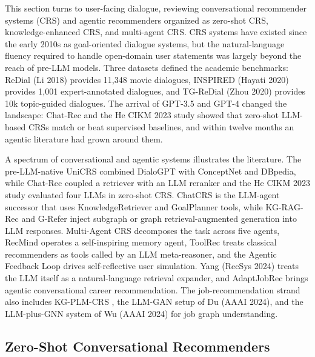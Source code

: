 \documentclass{article}
\begin{document}
This section turns to user-facing dialogue, reviewing conversational recommender systems (CRS) and agentic recommenders organized as zero-shot CRS, knowledge-enhanced CRS, and multi-agent CRS. CRS systems have existed since the early 2010s as goal-oriented dialogue systems, but the natural-language fluency required to handle open-domain user statements was largely beyond the reach of pre-LLM models. Three datasets defined the academic benchmarks: ReDial (Li 2018) provides 11,348 movie dialogues, INSPIRED (Hayati 2020) provides 1,001 expert-annotated dialogues, and TG-ReDial (Zhou 2020) provides 10k topic-guided dialogues. The arrival of GPT-3.5 and GPT-4 changed the landscape: Chat-Rec \citep{gao2023chatrectowardsinte} and the He CIKM 2023 study showed that zero-shot LLM-based CRSs match or beat supervised baselines, and within twelve months an agentic literature had grown around them.

A spectrum of conversational and agentic systems illustrates the literature. The pre-LLM-native UniCRS \citep{wang2022asurveyonthefairne} combined DialoGPT with ConceptNet and DBpedia, while Chat-Rec \citep{gao2023chatrectowardsinte} coupled a retriever with an LLM reranker and the He CIKM 2023 study evaluated four LLMs in zero-shot CRS. ChatCRS \citep{li2025grefergraphretriev} is the LLM-agent successor that uses KnowledgeRetriever and GoalPlanner tools, while KG-RAG-Rec \citep{wang2025knowledgegraphretr} and G-Refer \citep{li2025grefergraphretriev} inject subgraph or graph retrieval-augmented generation into LLM responses. Multi-Agent CRS \citep{fang2024amultiagentconvers} decomposes the task across five agents, RecMind \citep{wang2024recmindlargelangua} operates a self-inspiring memory agent, ToolRec \citep{zhao2024recommendersystems} treats classical recommenders as tools called by an LLM meta-reasoner, and the Agentic Feedback Loop \citep{cai2024agenticfeedbackloo} drives self-reflective user simulation. Yang (RecSys 2024) treats the LLM itself as a natural-language retrieval expander, and AdaptJobRec \citep{wang2025knowledgegraphretr} brings agentic conversational career recommendation. The job-recommendation strand also includes KG-PLM-CRS \citep{zhang2024textlikeencodingof}, the LLM-GAN setup of Du (AAAI 2024), and the LLM-plus-GNN system of Wu (AAAI 2024) for job graph understanding.

\subsection{Zero-Shot Conversational Recommenders}\label{zero-shot-conversational-recommenders}
\end{document}
